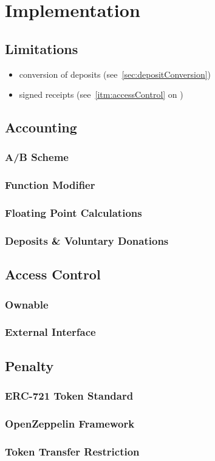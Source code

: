 
\chapter{Implementation}
\label{chp:implementation}

\section{Limitations}
\begin{itemize}
  \item conversion of deposits (see~\ref{sec:depositConversion})
  \item signed receipts (see~\ref{itm:accessControl} on )
\end{itemize}


\section{Accounting}

\subsection{A/B Scheme}
\subsection{Function Modifier}
\subsection{Floating Point Calculations}
\subsection{Deposits \& Voluntary Donations}

\section{Access Control}
\subsection{Ownable}
\subsection{External Interface}

\section{Penalty}
\subsection{ERC-721 Token Standard}
\subsection{OpenZeppelin Framework}
\subsection{Token Transfer Restriction}